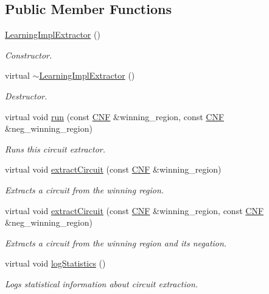 \subsection*{Public Member Functions}
\begin{DoxyCompactItemize}
\item 
\hyperlink{classLearningImplExtractor_a453451da144f6fef1f8769bc9522f3aa}{Learning\-Impl\-Extractor} ()
\begin{DoxyCompactList}\small\item\em Constructor. \end{DoxyCompactList}\item 
virtual \hyperlink{classLearningImplExtractor_ae5c70a32f0f4268be784e8081681e65d}{$\sim$\-Learning\-Impl\-Extractor} ()
\begin{DoxyCompactList}\small\item\em Destructor. \end{DoxyCompactList}\item 
virtual void \hyperlink{classLearningImplExtractor_ad13a1fc00465f95812df4673743e16eb}{run} (const \hyperlink{classCNF}{C\-N\-F} \&winning\-\_\-region, const \hyperlink{classCNF}{C\-N\-F} \&neg\-\_\-winning\-\_\-region)
\begin{DoxyCompactList}\small\item\em Runs this circuit extractor. \end{DoxyCompactList}\item 
virtual void \hyperlink{classCNFImplExtractor_ad329eedd50e443f44edc99db8c2e2613}{extract\-Circuit} (const \hyperlink{classCNF}{C\-N\-F} \&winning\-\_\-region)
\begin{DoxyCompactList}\small\item\em Extracts a circuit from the winning region. \end{DoxyCompactList}\item 
virtual void \hyperlink{classCNFImplExtractor_a5e9694425af3f1a76d8b21ace3c435d9}{extract\-Circuit} (const \hyperlink{classCNF}{C\-N\-F} \&winning\-\_\-region, const \hyperlink{classCNF}{C\-N\-F} \&neg\-\_\-winning\-\_\-region)
\begin{DoxyCompactList}\small\item\em Extracts a circuit from the winning region and its negation. \end{DoxyCompactList}\item 
virtual void \hyperlink{classCNFImplExtractor_aae098749e201b22294a70f6e0a4a58f0}{log\-Statistics} ()
\begin{DoxyCompactList}\small\item\em Logs statistical information about circuit extraction. \end{DoxyCompactList}\end{DoxyCompactItemize}
